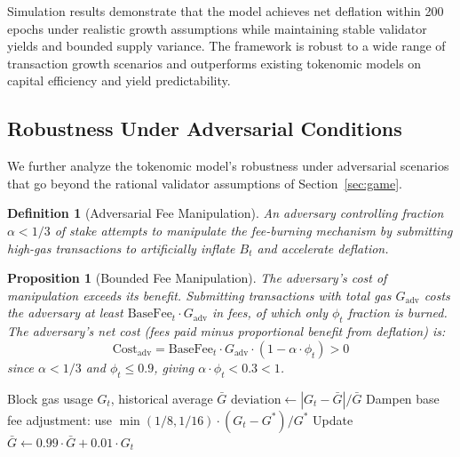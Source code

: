 \documentclass[11pt,a4paper]{article}
\newtheorem{proposition}[theorem]{Proposition}
\newtheorem{definition}{Definition}
\begin{document}
Simulation results demonstrate that the model achieves net deflation within 200 epochs under realistic growth assumptions while maintaining stable validator yields and bounded supply variance. The framework is robust to a wide range of transaction growth scenarios and outperforms existing tokenomic models on capital efficiency and yield predictability.

\subsection{Robustness Under Adversarial Conditions}

We further analyze the tokenomic model's robustness under adversarial scenarios that go beyond the rational validator assumptions of Section~\ref{sec:game}.

\begin{definition}[Adversarial Fee Manipulation]
An adversary controlling fraction $\alpha < 1/3$ of stake attempts to manipulate the fee-burning mechanism by submitting high-gas transactions to artificially inflate $B_t$ and accelerate deflation.
\end{definition}

\begin{proposition}[Bounded Fee Manipulation]
The adversary's cost of manipulation exceeds its benefit. Submitting transactions with total gas $G_{\text{adv}}$ costs the adversary at least $\text{BaseFee}_t \cdot G_{\text{adv}}$ in fees, of which only $\phi_t$ fraction is burned. The adversary's net cost (fees paid minus proportional benefit from deflation) is:
\begin{equation}
    \text{Cost}_{\text{adv}} = \text{BaseFee}_t \cdot G_{\text{adv}} \cdot (1 - \alpha \cdot \phi_t) > 0
\end{equation}
since $\alpha < 1/3$ and $\phi_t \leq 0.9$, giving $\alpha \cdot \phi_t < 0.3 < 1$.
\end{proposition}

\begin{algorithm}[H]
\caption{Adaptive Base Fee Under Manipulation Detection}
\label{alg:adaptive_base}
\begin{algorithmic}[1]
\Require Block gas usage $G_t$, historical average $\bar{G}$
\State $\text{deviation} \gets |G_t - \bar{G}| / \bar{G}$
 
    \State Dampen base fee adjustment: use $\min(1/8, 1/16) \cdot (G_t - G^*)/G^*$
\EndIf
\State Update $\bar{G} \gets 0.99 \cdot \bar{G} + 0.01 \cdot G_t$ 
\end{algorithmic}
\end{algorithm}
\end{document}
